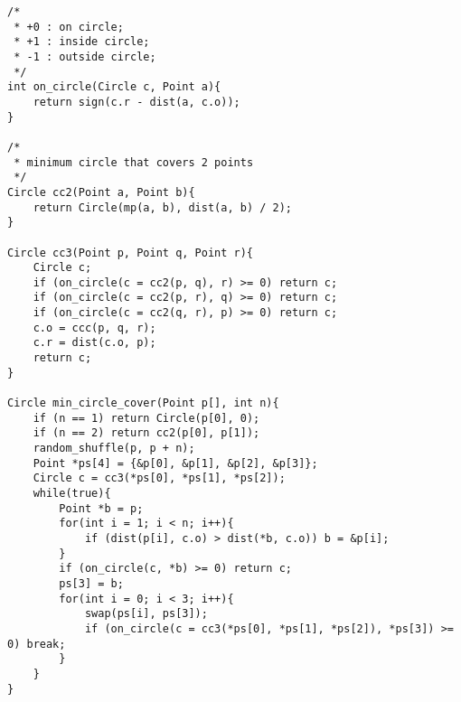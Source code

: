 \begin{verbatim}
/*
 * +0 : on circle;
 * +1 : inside circle;
 * -1 : outside circle;
 */
int on_circle(Circle c, Point a){
	return sign(c.r - dist(a, c.o));
}

/*
 * minimum circle that covers 2 points
 */
Circle cc2(Point a, Point b){
	return Circle(mp(a, b), dist(a, b) / 2);
}

Circle cc3(Point p, Point q, Point r){
	Circle c;
	if (on_circle(c = cc2(p, q), r) >= 0) return c;
	if (on_circle(c = cc2(p, r), q) >= 0) return c;
	if (on_circle(c = cc2(q, r), p) >= 0) return c;
	c.o = ccc(p, q, r);
	c.r = dist(c.o, p);
	return c;
}

Circle min_circle_cover(Point p[], int n){
	if (n == 1) return Circle(p[0], 0);
	if (n == 2) return cc2(p[0], p[1]);
	random_shuffle(p, p + n);
	Point *ps[4] = {&p[0], &p[1], &p[2], &p[3]};
	Circle c = cc3(*ps[0], *ps[1], *ps[2]);
	while(true){
		Point *b = p;
		for(int i = 1; i < n; i++){
			if (dist(p[i], c.o) > dist(*b, c.o)) b = &p[i];
		}
		if (on_circle(c, *b) >= 0) return c;
		ps[3] = b;
		for(int i = 0; i < 3; i++){
			swap(ps[i], ps[3]);
			if (on_circle(c = cc3(*ps[0], *ps[1], *ps[2]), *ps[3]) >= 0) break;
		}
	}
}
\end{verbatim}
